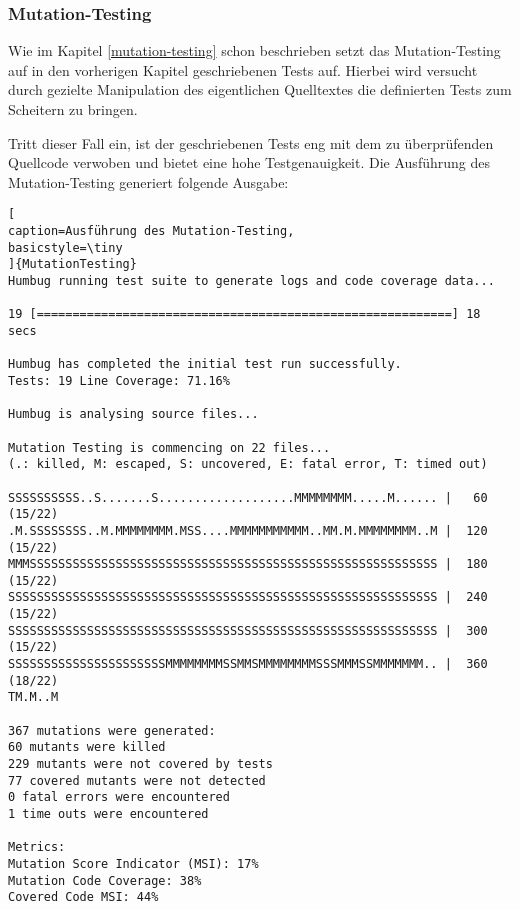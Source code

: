 



\subsubsection{Mutation-Testing}
Wie im Kapitel \ref*{mutation-testing} schon beschrieben setzt das Mutation-Testing auf in den vorherigen Kapitel geschriebenen Tests auf. Hierbei wird versucht durch gezielte Manipulation des eigentlichen Quelltextes die definierten Tests zum Scheitern zu bringen.

Tritt dieser Fall ein, ist der geschriebenen Tests eng mit dem zu überprüfenden Quellcode verwoben und bietet eine hohe Testgenauigkeit. Die Ausführung des Mutation-Testing generiert folgende Ausgabe:


\begin{lstlisting}[
caption=Ausführung des Mutation-Testing,
basicstyle=\tiny
]{MutationTesting}
Humbug running test suite to generate logs and code coverage data...

19 [==========================================================] 18 secs

Humbug has completed the initial test run successfully.
Tests: 19 Line Coverage: 71.16%

Humbug is analysing source files...

Mutation Testing is commencing on 22 files...
(.: killed, M: escaped, S: uncovered, E: fatal error, T: timed out)

SSSSSSSSSS..S.......S...................MMMMMMMM.....M...... |   60 (15/22)
.M.SSSSSSSS..M.MMMMMMMM.MSS....MMMMMMMMMMM..MM.M.MMMMMMMM..M |  120 (15/22)
MMMSSSSSSSSSSSSSSSSSSSSSSSSSSSSSSSSSSSSSSSSSSSSSSSSSSSSSSSSS |  180 (15/22)
SSSSSSSSSSSSSSSSSSSSSSSSSSSSSSSSSSSSSSSSSSSSSSSSSSSSSSSSSSSS |  240 (15/22)
SSSSSSSSSSSSSSSSSSSSSSSSSSSSSSSSSSSSSSSSSSSSSSSSSSSSSSSSSSSS |  300 (15/22)
SSSSSSSSSSSSSSSSSSSSSSMMMMMMMMSSMMSMMMMMMMMSSSMMMSSMMMMMMM.. |  360 (18/22)
TM.M..M

367 mutations were generated:
60 mutants were killed
229 mutants were not covered by tests
77 covered mutants were not detected
0 fatal errors were encountered
1 time outs were encountered

Metrics:
Mutation Score Indicator (MSI): 17%
Mutation Code Coverage: 38%
Covered Code MSI: 44%
\end{lstlisting}


